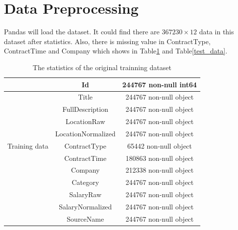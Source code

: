 \documentclass[12pt,journal,nofonttune]{IEEEtran}
\begin{document}
\section{Data Preprocessing}

Pandas will load the dataset. It could find there are $367230\times12$ data in this dataset after statistics. Also, there is missing value in ContractType, ContractTime and Company which shows in Table\ref{train_data} and Table\ref{test_data}.

\begin{table}[htbp]
\centering
\caption{The statistics of the original trainning dataset}
\label{train_data}
\begin{tabular}{|c|c|c|}
 \hline
   & Id                 & 244767 non-null int64  \\
 \hline
   & Title              & 244767 non-null object \\
 \hline
   & FullDescription    & 244767 non-null object \\
 \hline
   & LocationRaw        & 244767 non-null object \\
 \hline
   & LocationNormalized & 244767 non-null object \\
 \hline
 Training data & ContractType       & 65442 non-null object \\
 \hline
   & ContractTime       & 180863 non-null object \\
 \hline
   & Company            & 212338 non-null object \\
 \hline
   & Category           & 244767 non-null object \\
 \hline
   & SalaryRaw          & 244767 non-null object \\
 \hline
   & SalaryNormalized   & 244767 non-null object \\
 \hline
   & SourceName         & 244767 non-null object \\
 \hline
\end{tabular}
\end{table}
\end{document}

